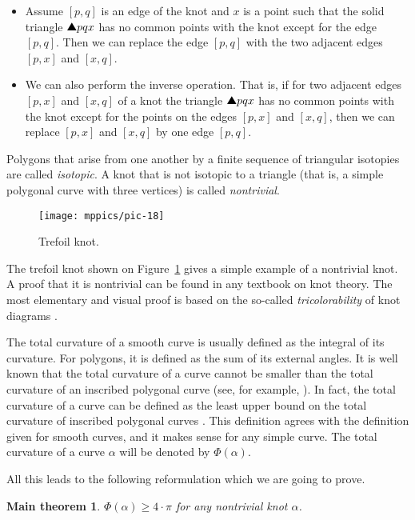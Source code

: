 \documentclass{article}
\newcommand*{\arXiv}[2]{#1} %
\theoremstyle{theorem}
\newtheorem*{maintheorem}{\arXiv{Main theorem}{Main Theorem}}
\newtheorem{Crofton-type formula}[theorem]{Crofton-type formula}
\newtheorem{Douglas--Rado theorem}[theorem]{\arXiv{Douglas--Rado theorem}{Theorem}}
\newtheorem{Extended monotonicity theorem}[theorem]{\arXiv{Extended monotonicity theorem}{Theorem}}
\theoremstyle{definition}
\def\solidtriangle{\text{\ding{115}}}
\def\ge{\geqslant}
\begin{document}
\begin{itemize}
\item Assume $[p,q]$ is an edge of the knot and $x$
is a point such that the solid triangle $\solidtriangle pqx$  has no common points with the knot except for the edge $[p,q]$.
Then we can replace the edge $[p,q]$ with the two adjacent edges $[p,x]$ and $[x,q]$.
\item We can also perform the inverse operation.
That is, if for two adjacent edges $[p,x]$ and $[x,q]$ of a knot the triangle
$\solidtriangle pqx$ has no common points with the knot except for the points on the edges $[p,x]$ and $[x,q]$,
then we can replace $[p,x]$ and $[x,q]$ by one edge $[p,q]$.
\end{itemize}

Polygons that arise from one another by a finite sequence of
triangular isotopies are called \emph{isotopic}.
A knot that is not isotopic to a triangle (that is, a simple polygonal curve with three vertices) is called \emph{nontrivial}.

\begin{figure}[!ht]
\vskip-0mm
\centering
\arXiv{\texttt{[image: mppics/pic-18]}}{\texttt{[image: pic-18]}}
\vskip0mm
\caption{Trefoil knot.}
\label{fig1}
\end{figure}

The trefoil knot shown on Figure~\ref{fig1} gives a simple example of a nontrivial knot.
A proof that it is nontrivial can be found in any textbook on knot theory.
The most elementary and visual proof is based on the so-called \emph{tricolorability} of knot diagrams \cite[Section 1.5]{adams}.

The total curvature of a smooth curve is usually defined as the integral of its curvature.
For polygons, it is defined as the sum of its external angles.
It is well known that the total curvature of a curve cannot be smaller than the total curvature of an inscribed polygonal curve (see, for example, \cite{petrunin-zamora}).
In fact, the total curvature of a curve can be defined as the least upper bound on the total curvature of inscribed polygonal curves \cite{aleksandrov-reshetnyak, sullivan-curves}.
This definition agrees with the definition given for smooth curves, and it makes sense for any simple curve.
The total curvature of a curve $\alpha$ will be denoted by $\Phi(\alpha)$.

All this leads to the following reformulation which we are going to prove.

\begin{maintheorem}
\textit{$\Phi(\alpha)\ge 4\arXiv{{\cdot}}{}\pi$ for any nontrivial knot $\alpha$.}
\end{maintheorem}
\end{document}
